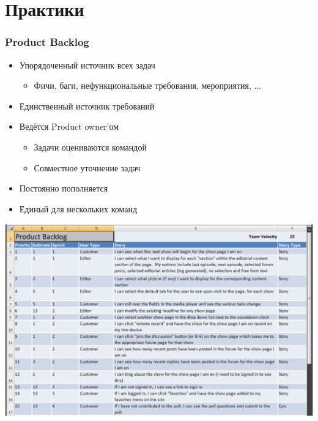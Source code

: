 \documentclass{../../slides-style}
\begin{document}
    \section{Практики}

    \begin{frame}
        \frametitle{Product Backlog}
        \begin{itemize}
            \item Упорядоченный источник всех задач
            \begin{itemize}
                \item Фичи, баги, нефункциональные требования, мероприятия, ...
            \end{itemize}
            \item Единственный источник требований
            \item Ведётся Product owner’ом
            \begin{itemize}
                \item Задачи оцениваются командой
                \item Совместное уточнение задач
            \end{itemize} 
            \item Постоянно пополняется
            \item Единый для нескольких команд
        \end{itemize}
    \end{frame}

    \begin{frame}
        \begin{center}
            \includegraphics[width=\textwidth]{backlog.png}
        \end{center}
    \end{frame}
\end{document}
